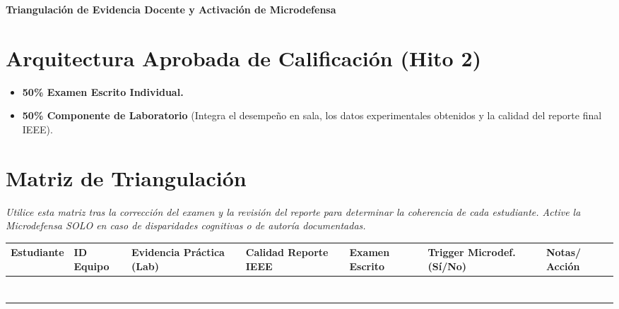 \documentclass[11pt, a4paper]{article}
\begin{document}
\begin{tcolorbox}[colback=ucbblue!5!white, colframe=ucbblue, title=\textbf{Matriz de Comparación Post-Evaluación (Hito 2)}]
    \centering \textbf{Triangulación de Evidencia Docente y Activación de Microdefensa}
\end{tcolorbox}

\section*{Arquitectura Aprobada de Calificación (Hito 2)}
\begin{itemize}
    \item \textbf{50\% Examen Escrito Individual.}
    \item \textbf{50\% Componente de Laboratorio} (Integra el desempeño en sala, los datos experimentales obtenidos y la calidad del reporte final IEEE).
\end{itemize}

\section*{Matriz de Triangulación}
\textit{Utilice esta matriz tras la corrección del examen y la revisión del reporte para determinar la coherencia de cada estudiante. Active la Microdefensa SOLO en caso de disparidades cognitivas o de autoría documentadas.}

\vspace{0.3cm}
\renewcommand{\arraystretch}{1.5}
\noindent
\begin{tabularx}{\textwidth}{>{\RaggedRight\arraybackslash}X >{\centering\arraybackslash}p{1.2cm} >{\centering\arraybackslash}p{2cm} >{\centering\arraybackslash}p{2cm} >{\centering\arraybackslash}p{2.5cm} >{\centering\arraybackslash}p{1.8cm} >{\RaggedRight\arraybackslash}p{2.5cm}}
\toprule
\textbf{Estudiante} & \textbf{ID Equipo} & \textbf{Evidencia Práctica (Lab)} & \textbf{Calidad Reporte IEEE} & \textbf{Examen Escrito} & \textbf{Trigger Microdef. (Sí/No)} & \textbf{Notas/ Acción} \\ 
\midrule
 & & & & & & \\ \addlinespace
 & & & & & & \\ \addlinespace
 & & & & & & \\ \addlinespace
 & & & & & & \\ \addlinespace
 & & & & & & \\ \addlinespace
 & & & & & & \\ \addlinespace
 & & & & & & \\ 
\bottomrule
\end{tabularx}
\end{document}
